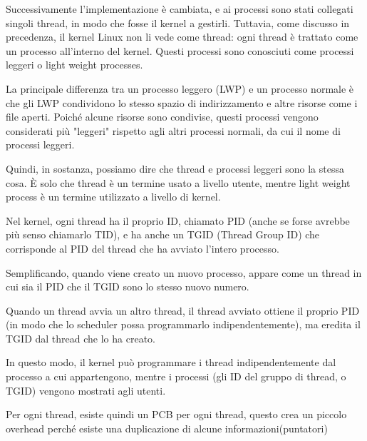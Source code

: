 \documentclass[11pt]{article}
\begin{document}
Successivamente l'implementazione è cambiata, e ai processi sono stati collegati singoli thread, in modo che fosse il kernel a gestirli. Tuttavia, come discusso in precedenza, il kernel Linux non li vede come thread: ogni thread è trattato come un processo all'interno del kernel. Questi processi sono conosciuti come processi leggeri o light weight processes.

La principale differenza tra un processo leggero (LWP) e un processo normale è che gli LWP condividono lo stesso spazio di indirizzamento e altre risorse come i file aperti. Poiché alcune risorse sono condivise, questi processi vengono considerati più "leggeri" rispetto agli altri processi normali, da cui il nome di processi leggeri.

Quindi, in sostanza, possiamo dire che thread e processi leggeri sono la stessa cosa. È solo che thread è un termine usato a livello utente, mentre light weight process è un termine utilizzato a livello di kernel.


Nel kernel, ogni thread ha il proprio ID, chiamato PID (anche se forse avrebbe più senso chiamarlo TID), e ha anche un TGID (Thread Group ID) che corrisponde al PID del thread che ha avviato l'intero processo.

Semplificando, quando viene creato un nuovo processo, appare come un thread in cui sia il PID che il TGID sono lo stesso nuovo numero.

Quando un thread avvia un altro thread, il thread avviato ottiene il proprio PID (in modo che lo scheduler possa programmarlo indipendentemente), ma eredita il TGID dal thread che lo ha creato.

In questo modo, il kernel può programmare i thread indipendentemente dal processo a cui appartengono, mentre i processi (gli ID del gruppo di thread, o TGID) vengono mostrati agli utenti.

Per ogni thread, esiste quindi un PCB per ogni thread, questo crea un piccolo overhead perché esiste una duplicazione di alcune informazioni(puntatori)
\end{document}
